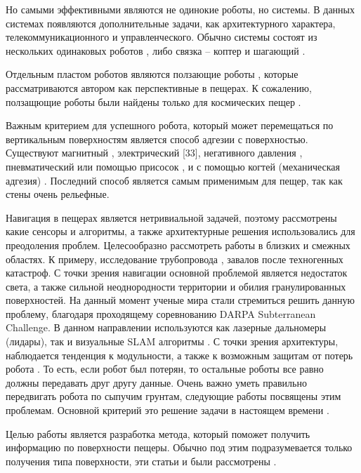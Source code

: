 Но самыми эффективными являются не одинокие роботы, но системы. В данных системах появляются дополнительные задачи, как архитектурного характера, телекоммуникационного и управленческого. Обычно системы состоят из нескольких одинаковых роботов \cite{Vaquero2018}, либо связка – коптер и шагающий \cite{Chen2010,Cantelli2013}.

Отдельным пластом роботов являются ползающие роботы \cite{Schmidt2013}, которые рассматриваются автором как перспективные в пещерах. К сожалению, ползащющие роботы были найдены только для космических пещер \cite{Parness2017}. 

Важным критерием для успешного робота, который может перемещаться по вертикальным поверхностям является способ адгезии с поверхностью. Существуют магнитный \cite{Lee2012,Tavakoli2012,Kotay1996,Xu2017}, электрический \cite{Li2017}[33], негативного давления \cite{Lee2012,Tavakoli2012,Papachristos2019}, пневматический или помощью присосок \cite{Nagakubo1994,Tlale2012}, и с помощью когтей (механическая адгезия) \cite{Parness2017,Bretl2006,SangbaeKim2005,Sintov2011}. Последний способ является самым применимым для пещер, так как стены очень рельефные.

Навигация в пещерах является нетривиальной задачей, поэтому рассмотрены какие сенсоры и алгоритмы, а также архитектурные решения использовались для преодоления проблем. Целесообразно рассмотреть работы в близких и смежных областях. К примеру, исследование трубопровода \cite{Savin2017}, завалов после техногенных катастроф. С точки зрения навигации основной проблемой является недостаток света, а также сильной неоднородности территории и обилия гранулированных поверхностей. На данный момент ученые мира стали стремиться решить данную проблему, благодаря проходящему соревнованию DARPA Subterranean Challenge. В данном направлении используются как лазерные дальномеры (лидары), так и визуальные SLAM алгоритмы \cite{Mascarich2018a,Dang2019a,Fairfield2006,Chhaniyara2012}. С точки зрения архитектуры, наблюдается тенденция к модульности, а также к возможным защитам от потерь робота \cite{Miller2019,Wei2009}. То есть, если робот был потерян, то остальные роботы все равно должны передавать друг другу данные. Очень важно уметь правильно передвигать робота по сыпучим грунтам, следующие работы посвящены этим проблемам. Основной критерий это решение задачи в настоящем времени \cite{Tan2016,Savin2017,Chhaniyara2012,Tsounis2019, Li2009,Bjelonic2019,DeViragh2019,Buchanan2019}.

Целью работы является разработка метода, который поможет получить информацию по поверхности пещеры. Обычно под этим подразумевается только получения типа поверхности, эти статьи и были рассмотрены \cite{Wu2016,Wu2020,Luo2017}.

